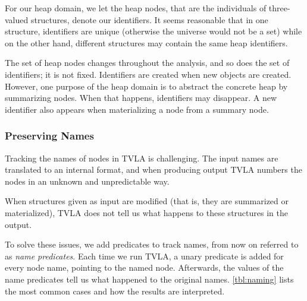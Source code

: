 \documentclass[11pt,a4paper,english]{article}
\begin{document}
For our heap domain, we let the heap nodes, that are the individuals of
three-valued structures, denote our identifiers. It seems reasonable that in one
structure, identifiers are unique (otherwise the universe would not be a set)
while on the other hand, different structures may contain the same heap
identifiers.

The set of heap nodes changes throughout the analysis, and so does the set of
identifiers; it is not fixed. Identifiers are created when new objects are
created. However, one purpose of the heap domain is to abstract the concrete
heap by summarizing nodes. When that happens, identifiers may disappear. A new
identifier also appears when materializing a node from a summary node. 

\subsubsection{Preserving Names}  
\label{sct:namePred}
Tracking the names of nodes in TVLA is challenging. The input names
are translated to an internal format, and when producing output TVLA numbers
the nodes in an unknown and unpredictable way. 

When structures given as input are modified (that is, they are summarized or
materialized), TVLA does not tell us what happens to these structures in the
output.

To solve these issues, we add predicates to track names, from now on
referred to as \textit{name predicates}. Each time we run TVLA, a unary
predicate is added for every node name, pointing to the named node. Afterwards,
the values of the name predicates tell us what happened to the original names.
\autoref{tbl:naming} lists the most common cases and how the results are
interpreted.
\end{document}
